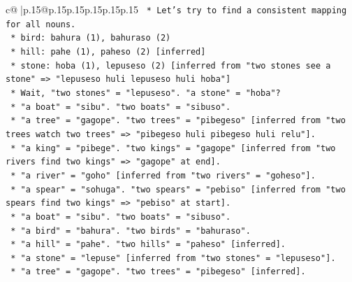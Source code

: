 \documentclass{article}
\begin{document}
{\begin{supertabular}{c@{$\;$}|p{.15\linewidth}@{}p{.15\linewidth}p{.15\linewidth}p{.15\linewidth}p{.15\linewidth}p{.15\linewidth}}
{{{\texttt{                                                    *   Let's try to find a consistent mapping for all nouns.} \\
\texttt{                                                        *   bird: bahura (1), bahuraso (2)} \\
\texttt{                                                        *   hill: pahe (1), paheso (2) {[}inferred{]}} \\
\texttt{                                                        *   stone: hoba (1), lepuseso (2) {[}inferred from "two stones see a stone" => "lepuseso huli lepuseso huli hoba"{]}} \\
\texttt{                                                            *   Wait, "two stones" = "lepuseso". "a stone" = "hoba"?} \\
\texttt{                                                            *   "a boat" = "sibu". "two boats" = "sibuso".} \\
\texttt{                                                            *   "a tree" = "gagope". "two trees" = "pibegeso" {[}inferred from "two trees watch two trees" => "pibegeso huli pibegeso huli relu"{]}.} \\
\texttt{                                                            *   "a king" = "pibege". "two kings" = "gagope" {[}inferred from "two rivers find two kings" => "gagope" at end{]}.} \\
\texttt{                                                            *   "a river" = "goho" {[}inferred from "two rivers" = "goheso"{]}.} \\
\texttt{                                                            *   "a spear" = "sohuga". "two spears" = "pebiso" {[}inferred from "two spears find two kings" => "pebiso" at start{]}.} \\
\texttt{                                                            *   "a boat" = "sibu". "two boats" = "sibuso".} \\
\texttt{                                                            *   "a bird" = "bahura". "two birds" = "bahuraso".} \\
\texttt{                                                            *   "a hill" = "pahe". "two hills" = "paheso" {[}inferred{]}.} \\
\texttt{                                                            *   "a stone" = "lepuse" {[}inferred from "two stones" = "lepuseso"{]}.} \\
\texttt{                                                            *   "a tree" = "gagope". "two trees" = "pibegeso" {[}inferred{]}.} \\
}}}
\end{supertabular}}
\end{document}
